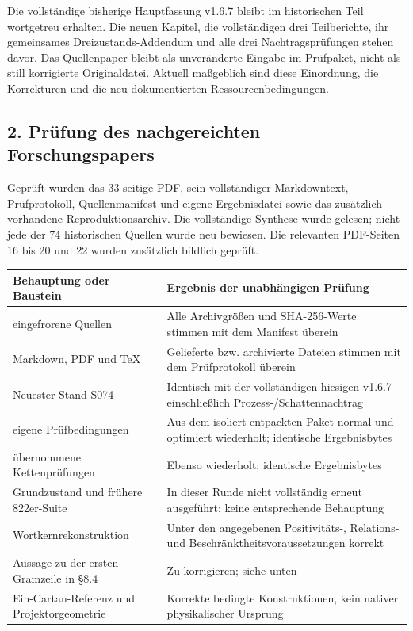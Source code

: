 Die vollständige bisherige Hauptfassung v1.6.7 bleibt im historischen
Teil wortgetreu erhalten. Die neuen Kapitel, die vollständigen drei
Teilberichte, ihr gemeinsames Dreizustands-Addendum und alle drei
Nachtragsprüfungen stehen davor. Das Quellenpaper bleibt als
unveränderte Eingabe im Prüfpaket, nicht als still korrigierte
Originaldatei. Aktuell maßgeblich sind diese Einordnung, die Korrekturen
und die neu dokumentierten Ressourcenbedingungen.

\subsection{2. Prüfung des nachgereichten
Forschungspapers}\label{pruxfcfung-des-nachgereichten-forschungspapers}

Geprüft wurden das 33-seitige PDF, sein vollständiger Markdowntext,
Prüfprotokoll, Quellenmanifest und eigene Ergebnisdatei sowie das
zusätzlich vorhandene Reproduktionsarchiv. Die vollständige Synthese
wurde gelesen; nicht jede der 74 historischen Quellen wurde neu
bewiesen. Die relevanten PDF-Seiten 16 bis 20 und 22 wurden zusätzlich
bildlich geprüft.

{\def\LTcaptype{none} %
\begin{longtable}[]{@{}
  >{\raggedright\arraybackslash}p{}
  >{\raggedright\arraybackslash}p{}@{}}
\toprule\noalign{}
\begin{minipage}[b]{\linewidth}\raggedright
Behauptung oder Baustein
\end{minipage} & \begin{minipage}[b]{\linewidth}\raggedright
Ergebnis der unabhängigen Prüfung
\end{minipage} \\
\midrule\noalign{}
\endhead
\bottomrule\noalign{}
\endlastfoot
74 eingefrorene Quellen & Alle Archivgrößen und SHA-256-Werte stimmen
mit dem Manifest überein \\
Markdown, PDF und TeX & Gelieferte bzw. archivierte Dateien stimmen mit
dem Prüfprotokoll überein \\
Neuester Stand S074 & Identisch mit der vollständigen hiesigen v1.6.7
einschließlich Prozess-/Schattennachtrag \\
57 eigene Prüfbedingungen & Aus dem isoliert entpackten Paket normal und
optimiert wiederholt; identische Ergebnisbytes \\
20 übernommene Kettenprüfungen & Ebenso wiederholt; identische
Ergebnisbytes \\
Grundzustand und frühere 822er-Suite & In dieser Runde nicht vollständig
erneut ausgeführt; keine entsprechende Behauptung \\
Wortkernrekonstruktion & Unter den angegebenen Positivitäts-, Relations-
und Beschränktheitsvoraussetzungen korrekt \\
Aussage zu der ersten Gramzeile in §8.4 & Zu korrigieren; siehe unten \\
Ein-Cartan-Referenz und Projektorgeometrie & Korrekte bedingte
Konstruktionen, kein nativer physikalischer Ursprung \\
\end{longtable}
}

